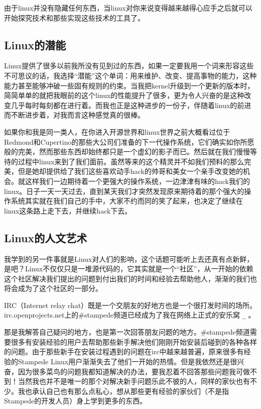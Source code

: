 由于linux并没有隐藏任何东西，当linux对你来说变得越来越得心应手之后就可以开始探究技术和那些实现这些技术的工具了。


\subsection{Linux的潜能}

Linux提供了很多以前我所没有见到过的东西，如果一定要我用一个词来形容这些不可思议的话，我选择“潜能”这个单词：用来维护、改变、提高事物的能力，这种能力甚至能够冲破一些固有规则的约束。当我把kernel升级到一个更新的版本时，简简单单的就把我眼前的这个linux的性能提升了很多，更为令人兴奋的是这种改变几乎每时每刻都在进行着。而我也正是这种进步的一份子，伴随着linux的前进而不断进步着，对我而言这种感觉真的很棒。

如果你和我是同一类人，在你进入开源世界和linux世界之前大概看过位于Redmond和Cupertino的那些大公司们准备的下一代操作系统，它们确实如你所愿般的完美，然而那些东西却始终都只是一个虚幻的影子而已。然后就在我们慢慢等待的过程中linux来到了我们面前。虽然等来的这个精灵并不如我们预料的那么完美，但是她却提供给了我们这些喜欢动手hack的帅哥和美女一个亲手改变她的机会。就这样我们一边期待着一个更强大的操作系统，一边津津有味的hack我们的linux。日子一天一天过去，直到某天我们才突然发现原来期待着的那个强大的操作系统其实就在我们自己的手中，大家不约而同的笑了起来，也决定了继续在linux这条路上走下去，并继续hack下去。

\subsection{Linux的人文艺术}

我学到的另一件事就是Linux对人们的影响，这个话题可能听上去还真有点新鲜，是吧？Linux不仅仅只是一堆源代码的，它其实就是一个“社区”，从一开始的依赖这个社区解决我们提出的问题到付出我们的时间和经验去帮助他人，渐渐的我们也将会成为了这个社区的一部分。

IRC（Internet relay chat）既是一个交朋友的好地方也是一个很打发时间的场所。irc.openprojects.net上的\#stampede频道已经成为了我在网络上正式的安乐窝
\verb ^_^  。

那是我解答自己疑问的地方，也是第一次回答朋友问题的地方。\#stampede频道需要很多有安装经验的用户去帮助那些新手解决他们刚刚开始安装后碰到的各种各样的问题。由于那些新手在安装过程遇到的问题在irc中越来越普遍，原来很多有经验的Stampede Linux用户渐渐失去了他们一开始的热情。但是我依然还是很兴奋，因为很多菜鸟的问题我都知道解决的办法，要我忍着不回答那些问题我可做不到！当然我也并不是唯一的那个对解决新手问题乐此不彼的人，同样的家伙也有不少。我也承认自己也有那么点私心，想从那些更有经验的家伙们（不是指Stampede的开发人员）身上学到更多的东西。

